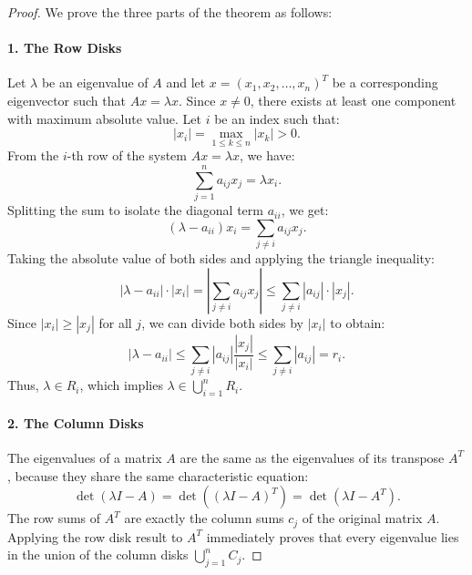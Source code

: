 \documentclass[../main.tex]{subfiles}
\begin{document}
\begin{proof}
	We prove the three parts of the theorem as follows:

	\paragraph{1. The Row Disks}
	Let $\lambda$ be an eigenvalue of $A$ and let $x = (x_1, x_2, \ldots, x_n)^T$ be a corresponding eigenvector such that $Ax = \lambda x$. Since $x \neq 0$, there exists at least one component with maximum absolute value. Let $i$ be an index such that:
	\begin{equation*}
		|x_i| = \max_{1 \leq k \leq n} |x_k| > 0.
	\end{equation*}
	From the $i$-th row of the system $Ax = \lambda x$, we have:
	\begin{equation*}
		\sum_{j=1}^n a_{ij} x_j = \lambda x_i.
	\end{equation*}
	Splitting the sum to isolate the diagonal term $a_{ii}$, we get:
	\begin{equation*}
		(\lambda - a_{ii})x_i = \sum_{j \neq i} a_{ij} x_j.
	\end{equation*}
	Taking the absolute value of both sides and applying the triangle inequality:
	\begin{equation*}
		|\lambda - a_{ii}| \cdot |x_i| = \left| \sum_{j \neq i} a_{ij} x_j \right| \leq \sum_{j \neq i} |a_{ij}| \cdot |x_j|.
	\end{equation*}
	Since $|x_i| \geq |x_j|$ for all $j$, we can divide both sides by $|x_i|$ to obtain:
	\begin{equation*}
		|\lambda - a_{ii}| \leq \sum_{j \neq i} |a_{ij}| \frac{|x_j|}{|x_i|} \leq \sum_{j \neq i} |a_{ij}| = r_i.
	\end{equation*}
	Thus, $\lambda \in R_i$, which implies $\lambda \in \bigcup_{i=1}^n R_i$.

	\paragraph{2. The Column Disks}
	The eigenvalues of a matrix $A$ are the same as the eigenvalues of its transpose $A^T$, because they share the same characteristic equation:
	\begin{equation*}
		\det(\lambda I - A) = \det((\lambda I - A)^T) = \det(\lambda I - A^T).
	\end{equation*}
	The row sums of $A^T$ are exactly the column sums $c_j$ of the original matrix $A$. Applying the row disk result to $A^T$ immediately proves that every eigenvalue lies in the union of the column disks $\bigcup_{j=1}^n C_j$.


\end{proof}
\end{document}
